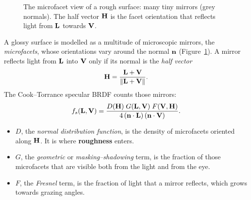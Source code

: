\begin{figure}[ht]
\centering
{}
\caption{The microfacet view of a rough surface: many tiny mirrors (grey normals). The half
vector $\mathbf{H}$ is the facet orientation that reflects light from $\mathbf{L}$ towards $\mathbf{V}$.}
\label{fig:microfacets}
\end{figure}

A glossy surface is modelled as a multitude of microscopic mirrors, the \emph{microfacets},
whose orientations vary around the normal $\mathbf{n}$ (Figure~\ref{fig:microfacets}). A mirror
reflects light from $\mathbf{L}$ into $\mathbf{V}$ only if its normal is the \emph{half vector}
\[
  \mathbf{H} = \frac{\mathbf{L}+\mathbf{V}}{\lVert\mathbf{L}+\mathbf{V}\rVert}.
\]
The Cook--Torrance specular BRDF \cite{cook1982} counts those mirrors:
\[
  f_s(\mathbf{L},\mathbf{V}) = \frac{D(\mathbf{H})\;G(\mathbf{L},\mathbf{V})\;F(\mathbf{V},\mathbf{H})}
                              {4\,(\mathbf{n}\cdot\mathbf{L})\,(\mathbf{n}\cdot\mathbf{V})} .
\]
\begin{itemize}
\item $D$, the \emph{normal distribution function}, is the density of microfacets oriented
along $\mathbf{H}$. It is where \textbf{roughness} enters.
\item $G$, the \emph{geometric} or \emph{masking--shadowing} term, is the fraction of those
microfacets that are visible both from the light and from the eye.
\item $F$, the \emph{Fresnel} term, is the fraction of light that a mirror reflects, which grows
towards grazing angles.
\end{itemize}

